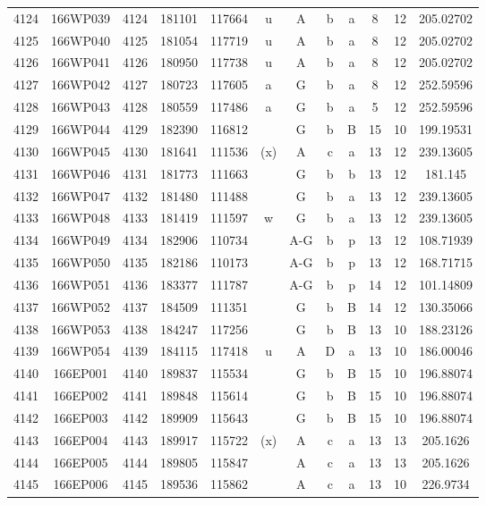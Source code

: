 \begin{tabular}{|*{12}{c|}}
4124 & 166WP039 & 4124 & 181101 & 117664 & u & A & b & a & 8 & 12 & 205.02702 \\ 
4125 & 166WP040 & 4125 & 181054 & 117719 & u & A & b & a & 8 & 12 & 205.02702 \\ 
4126 & 166WP041 & 4126 & 180950 & 117738 & u & A & b & a & 8 & 12 & 205.02702 \\ 
4127 & 166WP042 & 4127 & 180723 & 117605 & a & G & b & a & 8 & 12 & 252.59596 \\ 
4128 & 166WP043 & 4128 & 180559 & 117486 & a & G & b & a & 5 & 12 & 252.59596 \\ 
4129 & 166WP044 & 4129 & 182390 & 116812 &  & G & b & B & 15 & 10 & 199.19531 \\ 
4130 & 166WP045 & 4130 & 181641 & 111536 & (x) & A & c & a & 13 & 12 & 239.13605 \\ 
4131 & 166WP046 & 4131 & 181773 & 111663 &  & G & b & b & 13 & 12 & 181.145 \\ 
4132 & 166WP047 & 4132 & 181480 & 111488 &  & G & b & a & 13 & 12 & 239.13605 \\ 
4133 & 166WP048 & 4133 & 181419 & 111597 & w & G & b & a & 13 & 12 & 239.13605 \\ 
4134 & 166WP049 & 4134 & 182906 & 110734 &  & A-G & b & p & 13 & 12 & 108.71939 \\ 
4135 & 166WP050 & 4135 & 182186 & 110173 &  & A-G & b & p & 13 & 12 & 168.71715 \\ 
4136 & 166WP051 & 4136 & 183377 & 111787 &  & A-G & b & p & 14 & 12 & 101.14809 \\ 
4137 & 166WP052 & 4137 & 184509 & 111351 &  & G & b & B & 14 & 12 & 130.35066 \\ 
4138 & 166WP053 & 4138 & 184247 & 117256 &  & G & b & B & 13 & 10 & 188.23126 \\ 
4139 & 166WP054 & 4139 & 184115 & 117418 & u & A & D & a & 13 & 10 & 186.00046 \\ 
4140 & 166EP001 & 4140 & 189837 & 115534 &  & G & b & B & 15 & 10 & 196.88074 \\ 
4141 & 166EP002 & 4141 & 189848 & 115614 &  & G & b & B & 15 & 10 & 196.88074 \\ 
4142 & 166EP003 & 4142 & 189909 & 115643 &  & G & b & B & 15 & 10 & 196.88074 \\ 
4143 & 166EP004 & 4143 & 189917 & 115722 & (x) & A & c & a & 13 & 13 & 205.1626 \\ 
4144 & 166EP005 & 4144 & 189805 & 115847 &  & A & c & a & 13 & 13 & 205.1626 \\ 
4145 & 166EP006 & 4145 & 189536 & 115862 &  & A & c & a & 13 & 10 & 226.9734 \\ 

\end{tabular}
